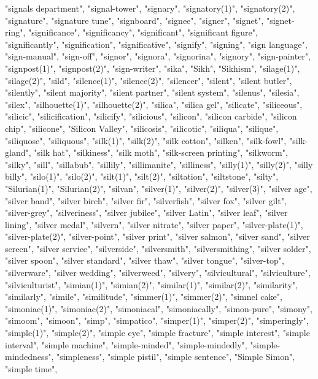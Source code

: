 "signals department",
"signal-tower",
"signary",
"signatory(1)",
"signatory(2)",
"signature",
"signature tune",
"signboard",
"signee",
"signer",
"signet",
"signet-ring",
"significance",
"significancy",
"significant",
"significant figure",
"significantly",
"signification",
"significative",
"signify",
"signing",
"sign language",
"sign-manual",
"sign-off",
"signor",
"signora",
"signorina",
"signory",
"sign-painter",
"signpost(1)",
"signpost(2)",
"sign-writer",
"sika",
"Sikh",
"Sikhism",
"silage(1)",
"silage(2)",
"sild",
"silence(1)",
"silence(2)",
"silencer",
"silent",
"silent butler",
"silently",
"silent majority",
"silent partner",
"silent system",
"silenus",
"silesia",
"silex",
"silhouette(1)",
"silhouette(2)",
"silica",
"silica gel",
"silicate",
"siliceous",
"silicic",
"silicification",
"silicify",
"silicious",
"silicon",
"silicon carbide",
"silicon chip",
"silicone",
"Silicon Valley",
"silicosis",
"silicotic",
"siliqua",
"silique",
"siliquose",
"siliquous",
"silk(1)",
"silk(2)",
"silk cotton",
"silken",
"silk-fowl",
"silk-gland",
"silk hat",
"silkiness",
"silk moth",
"silk-screen printing",
"silkworm",
"silky",
"sill",
"sillabub",
"sillily",
"sillimanite",
"silliness",
"silly(1)",
"silly(2)",
"silly billy",
"silo(1)",
"silo(2)",
"silt(1)",
"silt(2)",
"siltation",
"siltstone",
"silty",
"Silurian(1)",
"Silurian(2)",
"silvan",
"silver(1)",
"silver(2)",
"silver(3)",
"silver age",
"silver band",
"silver birch",
"silver fir",
"silverfish",
"silver fox",
"silver gilt",
"silver-grey",
"silveriness",
"silver jubilee",
"silver Latin",
"silver leaf",
"silver lining",
"silver medal",
"silvern",
"silver nitrate",
"silver paper",
"silver-plate(1)",
"silver-plate(2)",
"silver-point",
"silver print",
"silver salmon",
"silver sand",
"silver screen",
"silver service",
"silverside",
"silversmith",
"silversmithing",
"silver solder",
"silver spoon",
"silver standard",
"silver thaw",
"silver tongue",
"silver-top",
"silverware",
"silver wedding",
"silverweed",
"silvery",
"silvicultural",
"silviculture",
"silviculturist",
"simian(1)",
"simian(2)",
"similar(1)",
"similar(2)",
"similarity",
"similarly",
"simile",
"similitude",
"simmer(1)",
"simmer(2)",
"simnel cake",
"simoniac(1)",
"simoniac(2)",
"simoniacal",
"simoniacally",
"simon-pure",
"simony",
"simoom",
"simoon",
"simp",
"simpatico",
"simper(1)",
"simper(2)",
"simperingly",
"simple(1)",
"simple(2)",
"simple eye",
"simple fracture",
"simple interest",
"simple interval",
"simple machine",
"simple-minded",
"simple-mindedly",
"simple-mindedness",
"simpleness",
"simple pistil",
"simple sentence",
"Simple Simon",
"simple time",
